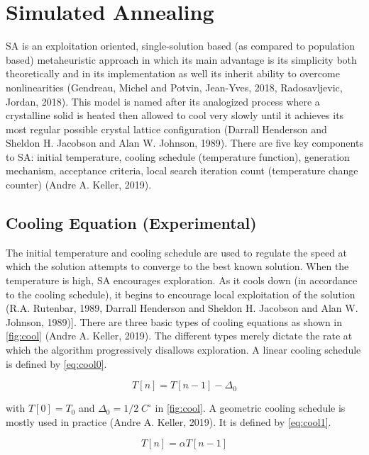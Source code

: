 \documentclass[11pt,a4paper,final]{article}
\newcommand{\Tau}{T}                        %
\begin{document}
\section{Simulated Annealing}
\label{sec:simulated-annealing}
SA is an exploitation oriented, single-solution based (as compared to population based) metaheuristic approach in which
its main advantage is its simplicity both theoretically and in its implementation as well its inherit ability to
overcome nonlinearities (Gendreau, Michel and Potvin, Jean-Yves, 2018, Radosavljevic, Jordan, 2018). This model is named after its
analogized process where a crystalline solid is heated then allowed to cool very slowly until it achieves its most
regular possible crystal lattice configuration (Darrall Henderson and Sheldon H. Jacobson and Alan W. Johnson, 1989). There are five key components to SA:
initial temperature, cooling schedule (temperature function), generation mechanism, acceptance criteria, local search
iteration count (temperature change counter) (Andre A. Keller, 2019).

\subsection{Cooling Equation (Experimental)}
\label{cooling-equation-experimental}
The initial temperature and cooling schedule are used to regulate the speed at which the solution attempts to converge
to the best known solution. When the temperature is high, SA encourages exploration. As it cools down (in accordance to
the cooling schedule), it begins to encourage local exploitation of the solution
(R.A. Rutenbar, 1989, Darrall Henderson and Sheldon H. Jacobson and Alan W. Johnson, 1989)]. There are three basic types of cooling equations as
shown in \ref{fig:cool} (Andre A. Keller, 2019). The different types merely dictate the rate at which the algorithm
progressively disallows exploration. A linear cooling schedule is defined by \ref{eq:cool0}.

\begin{equation}
\label{eq:cool0}
\Tau[n] = \Tau[n-1] - \Delta_0
\end{equation}

with \(\Tau[0] = \Tau_0\) and \(\Delta_0 = 1/2\; C^\circ\) in \ref{fig:cool}. A geometric cooling schedule is mostly used in practice
(Andre A. Keller, 2019). It is defined by \ref{eq:cool1}.

\begin{equation}
\label{eq:cool1}
\Tau[n] = \alpha \Tau[n-1]
\end{equation}
\end{document}
